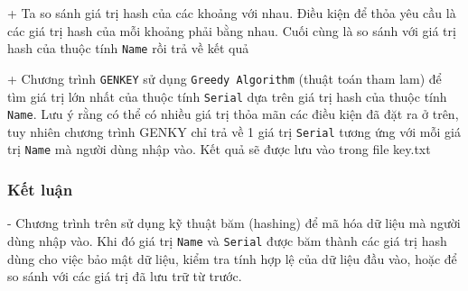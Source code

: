 + Ta so sánh giá trị hash của các khoảng với nhau. Điều kiện để thỏa yêu cầu là các giá trị hash của mỗi khoảng phải bằng nhau. Cuối cùng là so sánh với giá trị hash của thuộc tính \texttt{Name} rồi trả về kết quả

+ Chương trình \texttt{GENKEY} sử dụng \texttt{Greedy Algorithm} (thuật toán tham lam) để tìm giá trị lớn nhất của thuộc tính \texttt{Serial} dựa trên giá trị hash của thuộc tính \texttt{Name}. Lưu ý rằng có thể có nhiều giá trị thỏa mãn các điều kiện đã đặt ra ở trên, tuy nhiên chương trình GENKY chỉ trả về 1 giá trị \texttt{Serial} tương ứng với mỗi giá trị \texttt{Name} mà người dùng nhập vào. Kết quả sẽ được lưu vào trong file key.txt

\subsubsection{Kết luận}
- Chương trình trên sử dụng kỹ thuật băm (hashing) để mã hóa dữ liệu mà người dùng nhập vào. Khi đó giá trị \texttt{Name} và \texttt{Serial} được băm thành các giá trị hash dùng cho việc bảo mật dữ liệu, kiểm tra tính hợp lệ của dữ liệu đầu vào, hoặc để so sánh với các giá trị đã lưu trữ từ trước.